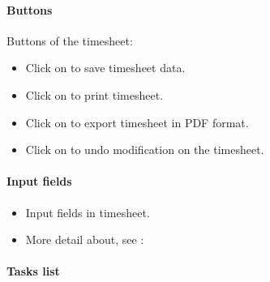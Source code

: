 \documentclass[letterpaper,10pt,english]{sphinxmanual}
\begin{document}
\paragraph{Buttons}

Buttons of the timesheet: 
\begin{itemize}
\item {} 
Click on  to save timesheet data.

\item {} 
Click on  to print timesheet.

\item {} 
Click on  to export timesheet in PDF format.

\item {} 
Click on  to undo modification on the timesheet.

\end{itemize}
\paragraph{Input fields}
\begin{itemize}
\item {} 
Input fields in timesheet. 

\item {} 
More detail about, see : {\hyperref[RealWorkAllocation:rwa-input-timesheet-label]{\emph{}}}

\end{itemize}
\newpage\paragraph{Tasks list}
\end{document}
